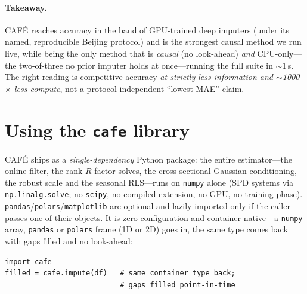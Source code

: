 \documentclass[10pt,twocolumn]{article}
\newcommand{\cafe}{CAF\'E}
\begin{document}
\paragraph{Takeaway.} \cafe{} reaches accuracy in the band of GPU-trained deep
imputers (under its named, reproducible Beijing protocol) and is the strongest
causal method we run live, while being the only method that is \emph{causal} (no
look-ahead) \emph{and} CPU-only---the two-of-three no prior imputer holds at
once---running the full suite in $\sim\!1$\,s. The right reading is competitive
accuracy \emph{at strictly less information and $\sim$1000$\times$ less compute},
not a protocol-independent ``lowest MAE'' claim.

\appendix
\section{Using the \texttt{cafe} library}\label{sec:lib}
\cafe{} ships as a \emph{single-dependency} Python package: the entire estimator---the
online filter, the rank-$R$ factor solves, the cross-sectional Gaussian conditioning, the
robust scale and the seasonal RLS---runs on \texttt{numpy} alone (SPD systems via
\texttt{np.linalg.solve}; no \texttt{scipy}, no compiled extension, no GPU, no training
phase). \texttt{pandas}/\texttt{polars}/\texttt{matplotlib} are optional and lazily
imported only if the caller passes one of their objects. It is zero-configuration and
container-native---a \texttt{numpy} array, \texttt{pandas} or \texttt{polars} frame (1D or
2D) goes in, the same type comes back with gaps filled and no look-ahead:
\begin{lstlisting}[style=cafepy]
import cafe
filled = cafe.impute(df)   # same container type back;
                           # gaps filled point-in-time
\end{lstlisting}
\end{document}
